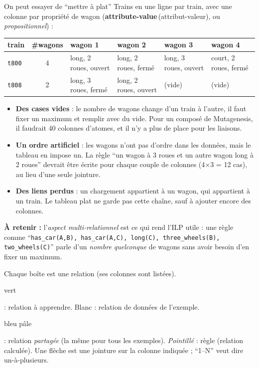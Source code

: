 \documentclass[10pt]{article}
\newcommand{\EN}[2]{\textbf{#1}\,{\scriptsize\textcolor{marine}{(#2)}}}
\newcommand{\ce}[1]{\begin{pourquoi}\textbf{\textcolor{marine}{À retenir :}} #1\end{pourquoi}}
\newcommand{\st}[1]{\par\needspace{7\baselineskip}\vspace{5pt}{\normalsize\bfseries\textcolor{marine}{#1}}\par\vspace{2pt}}
\begin{document}
\st{Pourquoi un seul tableau ne suffit pas (représentation propositionnelle)}
On peut essayer de ``mettre à plat'' Trains en une ligne par train, avec une colonne par propriété de wagon (\EN{attribute-value}{attribut-valeur}, ou \emph{propositionnel}) :
\renewcommand{\arraystretch}{1.25}
\begin{center}
\begin{tabular}{@{}l c l l l l@{}}
\textbf{train} & \textbf{\#wagons} & \textbf{wagon 1} & \textbf{wagon 2} & \textbf{wagon 3} & \textbf{wagon 4}\\\hline
\texttt{t800} & 4 & long, 2 roues, ouvert & long, 2 roues, fermé & long, 3 roues, ouvert & court, 2 roues, fermé\\
\texttt{t808} & 2 & long, 3 roues, fermé & long, 2 roues, ouvert & \textcolor{rouge}{(vide)} & \textcolor{rouge}{(vide)}\\
\end{tabular}
\end{center}
\begin{itemize}
  \item \textbf{Des cases vides} : le nombre de wagons change d'un train à l'autre, il faut fixer un maximum et remplir avec du vide. Pour un composé de Mutagenesis, il faudrait 40 colonnes d'atomes, et il n'y a plus de place pour les liaisons.
  \item \textbf{Un ordre artificiel} : les wagons n'ont pas d'ordre dans les données, mais le tableau en impose un. La règle ``un wagon à 3 roues et un autre wagon long à 2 roues'' devrait être écrite pour chaque couple de colonnes (4$\times$3 = 12 cas), au lieu d'une seule jointure.
  \item \textbf{Des liens perdus} : un chargement appartient à un wagon, qui appartient à un train. Le tableau plat ne garde pas cette chaîne, sauf à ajouter encore des colonnes.
\end{itemize}
\ce{l'\emph{aspect multi-relationnel} est ce qui rend l'ILP utile : une règle comme ``\texttt{has\_car(A,B), has\_car(A,C), long(C), three\_wheels(B), two\_wheels(C)}'' parle d'un \emph{nombre quelconque} de wagons sans avoir besoin d'en fixer un maximum.}

\st{Comment lire les schémas qui suivent}
Chaque boîte est une relation (ses colonnes sont listées). \colorbox{vert!25}{\strut vert} : relation à apprendre. Blanc : relation de données de l'exemple. \colorbox{pastel}{\strut bleu pâle} : relation \emph{partagée} (la même pour tous les exemples). \emph{Pointillé} : règle (relation calculée). Une flèche est une jointure sur la colonne indiquée ; ``1--N'' veut dire un-à-plusieurs.
\end{document}
